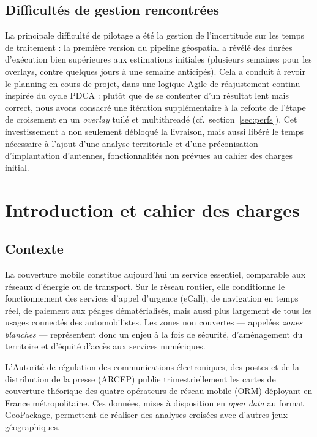 \documentclass[11pt,a4paper]{article}
\begin{document}
\subsection{Difficultés de gestion rencontrées}

La principale difficulté de pilotage a été la gestion de l'incertitude sur les temps de traitement : la première version du pipeline géospatial a révélé des durées d'exécution bien supérieures aux estimations initiales (plusieurs semaines pour les overlays, contre quelques jours à une semaine anticipés). Cela a conduit à revoir le planning en cours de projet, dans une logique Agile de réajustement continu inspirée du cycle PDCA : plutôt que de se contenter d'un résultat lent mais correct, nous avons consacré une itération supplémentaire à la refonte de l'étape de croisement en un \emph{overlay} tuilé et multithreadé (cf.~section~\ref{sec:perfs}). Cet investissement a non seulement débloqué la livraison, mais aussi libéré le temps nécessaire à l'ajout d'une analyse territoriale et d'une préconisation d'implantation d'antennes, fonctionnalités non prévues au cahier des charges initial.

\section{Introduction et cahier des charges}

\subsection{Contexte}

La couverture mobile constitue aujourd'hui un service essentiel, comparable aux réseaux d'énergie ou de transport. Sur le réseau routier, elle conditionne le fonctionnement des services d'appel d'urgence (eCall), de navigation en temps réel, de paiement aux péages dématérialisés, mais aussi plus largement de tous les usages connectés des automobilistes. Les zones non couvertes — appelées \emph{zones blanches} — représentent donc un enjeu à la fois de sécurité, d'aménagement du territoire et d'équité d'accès aux services numériques.

L'Autorité de régulation des communications électroniques, des postes et de la distribution de la presse (ARCEP) publie trimestriellement les cartes de couverture théorique des quatre opérateurs de réseau mobile (ORM) déployant en France métropolitaine. Ces données, mises à disposition en \emph{open data} au format GeoPackage, permettent de réaliser des analyses croisées avec d'autres jeux géographiques.
\end{document}
